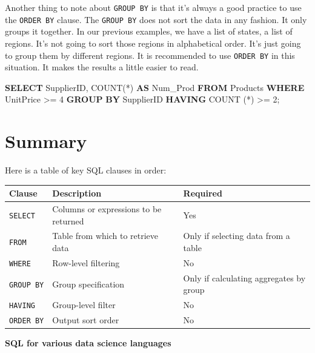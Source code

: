 \documentclass[]{book}
\makeatletter
\newenvironment{Shaded}{\begin{snugshade}}{\end{snugshade}}
\newcommand{\KeywordTok}[1]{\textcolor[rgb]{0.13,0.29,0.53}{\textbf{{#1}}}}
\newcommand{\DecValTok}[1]{\textcolor[rgb]{0.00,0.00,0.81}{{#1}}}
\newcommand{\FunctionTok}[1]{\textcolor[rgb]{0.00,0.00,0.00}{{#1}}}
\newcommand{\NormalTok}[1]{{#1}}
\newenvironment{kframe}{%
\medskip{}
\setlength{\fboxsep}{.8em}
 \def\at@end@of@kframe{}%
 \ifinner\ifhmode%
  \def\at@end@of@kframe{\end{minipage}}%
  \begin{minipage}{\columnwidth}%
 \fi\fi%
 \def\FrameCommand##1{\hskip\@totalleftmargin \hskip-\fboxsep
 \colorbox{shadecolor}{##1}\hskip-\fboxsep
     \hskip-\linewidth \hskip-\@totalleftmargin \hskip\columnwidth}%
 \MakeFramed {\advance\hsize-\width
   \@totalleftmargin\z@ \linewidth\hsize
   \@setminipage}}%
 {\par\unskip\endMakeFramed%
 \at@end@of@kframe}
\renewenvironment{Shaded}{\begin{kframe}}{\end{kframe}}
\theoremstyle{definition}
\theoremstyle{definition}
\theoremstyle{remark}
\makeatother
\begin{document}
Another thing to note about \texttt{GROUP\ BY} is that it's always a
good practice to use the \texttt{ORDER\ BY} clause. The
\texttt{GROUP\ BY} does not sort the data in any fashion. It only groups
it together. In our previous examples, we have a list of states, a list
of regions. It's not going to sort those regions in alphabetical order.
It's just going to group them by different regions. It is recommended to
use \texttt{ORDER\ BY} in this situation. It makes the results a little
easier to read.

\begin{Shaded}
\begin{Highlighting}[]
\KeywordTok{SELECT} \NormalTok{SupplierID, }\FunctionTok{COUNT}\NormalTok{(*) }\KeywordTok{AS} \NormalTok{Num_Prod}
\KeywordTok{FROM} \NormalTok{Products}
\KeywordTok{WHERE} \NormalTok{UnitPrice >= }\DecValTok{4}
\KeywordTok{GROUP} \KeywordTok{BY} \NormalTok{SupplierID}
\KeywordTok{HAVING} \FunctionTok{COUNT} \NormalTok{(*) >= }\DecValTok{2}\NormalTok{;}
\end{Highlighting}
\end{Shaded}

\section{Summary}\label{summary-1}

Here is a table of key SQL clauses in order:

\begin{longtable}[]{@{}lll@{}}
\toprule
Clause & Description & Required\tabularnewline
\midrule
\endhead
\texttt{SELECT} & Columns or expressions to be returned &
Yes\tabularnewline
\texttt{FROM} & Table from which to retrieve data & Only if selecting
data from a table\tabularnewline
\texttt{WHERE} & Row-level filtering & No\tabularnewline
\texttt{GROUP\ BY} & Group specification & Only if calculating
aggregates by group\tabularnewline
\texttt{HAVING} & Group-level filter & No\tabularnewline
\texttt{ORDER\ BY} & Output sort order & No\tabularnewline
\bottomrule
\end{longtable}

\textbf{SQL for various data science languages}
\end{document}
